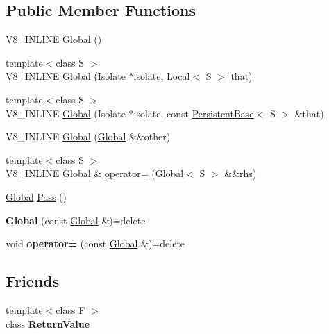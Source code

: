 \subsection*{Public Member Functions}
\begin{DoxyCompactItemize}
\item 
V8\+\_\+\+I\+N\+L\+I\+NE \mbox{\hyperlink{classv8_1_1Global_ab1efdf25ff6305e67f3266a6fe90527e}{Global}} ()
\item 
{\footnotesize template$<$class S $>$ }\\V8\+\_\+\+I\+N\+L\+I\+NE \mbox{\hyperlink{classv8_1_1Global_a8434bb6729eb4cd0cd85ad81bd8344ad}{Global}} (Isolate $\ast$isolate, \mbox{\hyperlink{classv8_1_1Local}{Local}}$<$ S $>$ that)
\item 
{\footnotesize template$<$class S $>$ }\\V8\+\_\+\+I\+N\+L\+I\+NE \mbox{\hyperlink{classv8_1_1Global_a6243ecb28bb97d066065796fa28f7415}{Global}} (Isolate $\ast$isolate, const \mbox{\hyperlink{classv8_1_1PersistentBase}{Persistent\+Base}}$<$ S $>$ \&that)
\item 
V8\+\_\+\+I\+N\+L\+I\+NE \mbox{\hyperlink{classv8_1_1Global_ab8f3c754a58146e6db67012cd74a49cb}{Global}} (\mbox{\hyperlink{classv8_1_1Global}{Global}} \&\&other)
\item 
{\footnotesize template$<$class S $>$ }\\V8\+\_\+\+I\+N\+L\+I\+NE \mbox{\hyperlink{classv8_1_1Global}{Global}} \& \mbox{\hyperlink{classv8_1_1Global_a9d3d7d8f10ad23e413f2027cc15ab209}{operator=}} (\mbox{\hyperlink{classv8_1_1Global}{Global}}$<$ S $>$ \&\&rhs)
\item 
\mbox{\hyperlink{classv8_1_1Global}{Global}} \mbox{\hyperlink{classv8_1_1Global_a914903149cc752468d4a3a11b6089c7e}{Pass}} ()
\item 
\mbox{\label{classv8_1_1Global_aefdf6b7bc98d7d011e1381b7cac7fa33}} 
{\bfseries Global} (const \mbox{\hyperlink{classv8_1_1Global}{Global}} \&)=delete
\item 
\mbox{\label{classv8_1_1Global_a732256fcf3edd799c55ba559921dff03}} 
void {\bfseries operator=} (const \mbox{\hyperlink{classv8_1_1Global}{Global}} \&)=delete
\end{DoxyCompactItemize}
\subsection*{Friends}
\begin{DoxyCompactItemize}
\item 
\mbox{\label{classv8_1_1Global_a53f604d3d6f2dc0647df33c9979f116a}} 
{\footnotesize template$<$class F $>$ }\\class {\bfseries Return\+Value}
\end{DoxyCompactItemize}


